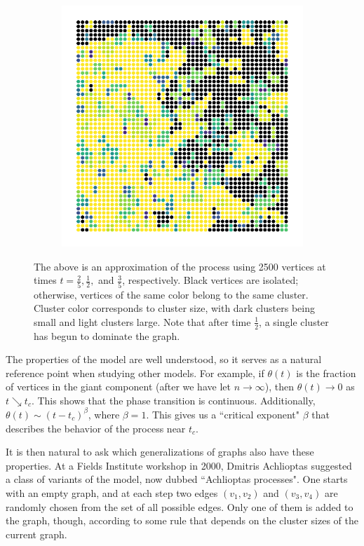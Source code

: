 \documentclass[twoside,10pt]{article}
\begin{document}
\begin{figure}[H]
\begin{subfigure}
	\end{subfigure}
	\begin{subfigure}
		\centering
                \includegraphics[scale=0.45]{fig/postcrit.pdf}
        \end{subfigure}
	\caption{The above is an approximation of the \ER process using 2500 vertices at times $t = \frac{2}{5} ,\frac{1}{2} ,$ and $\frac{3}{5} $, respectively. Black vertices are isolated; otherwise, vertices of the same color belong to the same cluster. Cluster color corresponds to cluster size, with dark clusters being small and light clusters large. Note that after time $\frac{1}{2} $, a single cluster has begun to dominate the graph.}
\end{figure}

The properties of the \ER model are well understood, so it serves as a natural reference point when studying other models. For example, if $\theta(t)$ is the fraction of vertices in the giant component (after we have let $n\to \infty$), then $\theta(t)\to 0$ as $t\searrow t_{c}$. This shows that the phase transition is continuous. Additionally, $\theta(t) \sim (t-t_{c})^{\beta}$, where $\beta=1$. This gives us a ``critical exponent" $\beta$ that describes the behavior of the process near $t_{c}$.

It is then natural to ask which generalizations of \ER graphs also have these properties. At a Fields Institute workshop in 2000, Dmitris Achlioptas suggested a class of variants of the \ER model, now dubbed ``Achlioptas processes". One starts with an empty graph, and at each step two edges $(v_1,v_2)$ and $(v_3,v_4)$ are randomly chosen from the set of all possible edges. Only one of them is added to the graph, though, according to some rule that depends on the cluster sizes of the current graph.
\end{document}
